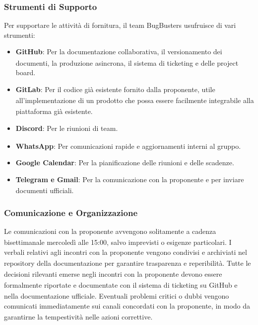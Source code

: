 \documentclass[a4paper,11pt]{article}
\newcommand{\G}{\textsubscript{\scalebox{0.6}{\textbf{G}}}}
\begin{document}
\subsubsection{Strumenti di Supporto}
Per supportare le attività di fornitura, il team BugBusters usufruisce di vari strumenti:
\begin{itemize}
    \item \textbf{GitHub\G{}}: Per la documentazione collaborativa, il versionamento\G{} dei documenti, la produzione asincrona,
     il sistema di ticketing e delle project board.
    \item \textbf{GitLab}: Per il codice già esistente fornito dalla proponente\G{}, utile all'implementazione\G{} di un prodotto\G{} che possa essere facilmente integrabile alla piattaforma già esistente.
    \item \textbf{Discord\G{}}: Per le riunioni di team.
    \item \textbf{WhatsApp}: Per comunicazioni rapide e aggiornamenti interni al gruppo.
    \item \textbf{Google Calendar}: Per la pianificazione delle riunioni e delle scadenze.
    \item \textbf{Telegram e Gmail}: Per la comunicazione con la proponente\G{} e per inviare documenti ufficiali. 
\end{itemize}

\subsubsection{Comunicazione e Organizzazione}
Le comunicazioni con la proponente\G{} avvengono solitamente a cadenza bisettimanale mercoledì alle 15:00, salvo imprevisti o esigenze particolari. 
I verbali relativi agli incontri con la proponente\G{} 
vengono condivisi e archiviati nel repository\G{} della 
documentazione per garantire trasparenza e reperibilità. 
Tutte le decisioni rilevanti emerse negli incontri con la proponente\G{} devono essere formalmente riportate e documentate 
con il sistema di ticketing su GitHub\G{} e nella documentazione ufficiale. Eventuali problemi 
critici o dubbi vengono comunicati immediatamente 
sui canali concordati con la proponente\G{}, in modo da garantirne la 
tempestività nelle azioni correttive.
\end{document}
